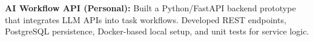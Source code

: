 
\textbf{AI Workflow API (Personal):} Built a Python/FastAPI backend prototype that integrates LLM APIs into task workflows. Developed REST endpoints, PostgreSQL persistence, Docker-based local setup, and unit tests for service logic.
